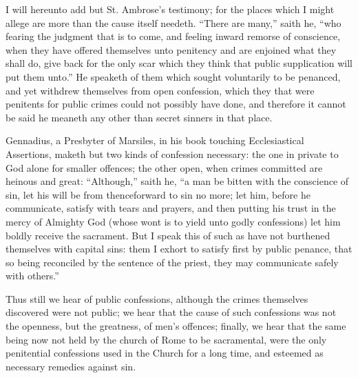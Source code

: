 I will hereunto add but St. Ambrose’s testimony; for the places which I might allege are more than the cause itself needeth. “There are many,” saith he, “who fearing the judgment that is to come, and feeling inward remorse of conscience, when they have offered themselves unto penitency and are enjoined what they shall do, give back for the only scar which they think that public supplication will put them unto.” He speaketh of them which sought voluntarily to be penanced, and yet withdrew themselves from open confession, which they that were penitents for public crimes could not possibly have done, and therefore it cannot be said he meaneth any other than secret sinners in that place.

Gennadius, a Presbyter of Marsiles, in his book touching Ecclesiastical Assertions, maketh but two kinds of confession necessary: the one in private to God alone for smaller offences; the other open, when crimes committed are heinous and great: “Although,” saith he, “a man be bitten with the conscience of sin, let his will be from thenceforward to sin no more; let him, before he communicate, satisfy with tears and prayers, and then putting his trust in the mercy of Almighty God (whose wont is to yield unto godly confessions) let him boldly receive the sacrament. But I speak this of such as have not burthened themselves with capital sins: them I exhort to satisfy first by public penance,  that so being reconciled by the sentence of the priest, they may communicate safely with others.”

Thus still we hear of public confessions, although the crimes themselves discovered were not public; we hear that the cause of such confessions was not the openness, but the greatness, of men’s offences; finally, we hear that the same being now not held by the church of Rome to be sacramental, were the only penitential confessions used in the Church for a long time, and esteemed as necessary remedies against sin.

